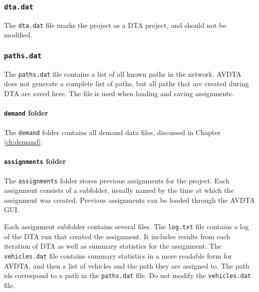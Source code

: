 

\subsubsection{\texttt{dta.dat}}
The \texttt{dta.dat} file marks the project as a DTA project, and should not be modified.

\subsubsection{\texttt{paths.dat}}
The \texttt{paths.dat} file contains a list of all known paths in the network. AVDTA does not generate a complete list of paths, but all paths that are created during DTA are saved here. The file is used when loading and saving assignments.




\paragraph*{\texttt{demand} folder}
The \texttt{demand} folder contains all demand data files, discussed in Chapter \ref{ch:demand}.

\paragraph*{\texttt{assignments} folder}
The \texttt{assignments} folder stores previous assignments for the project. Each assignment consists of a subfolder, usually named by the time at which the assignment was created. Previous assignments can be loaded through the AVDTA GUI.

Each assignment subfolder contains several files. The \texttt{log.txt} file contains a log of the DTA run that created the assignment. It includes results from each iteration of DTA as well as summary statistics for the assignment. The \texttt{vehicles.dat} file contains summary statistics in a more readable form for AVDTA, and then a list of vehicles and the path they are assigned to. The path ids correspond to a path in the \texttt{paths.dat} file. Do not modify the \texttt{vehicles.dat} file.